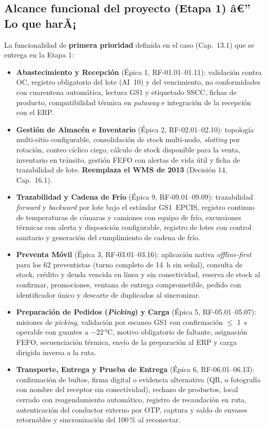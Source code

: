 \subsection{Alcance funcional del proyecto (Etapa 1) â€” Lo que harÃ¡}

La funcionalidad de \textbf{primera prioridad} definida en el caso (Cap.\ 13.1) que se entrega en la Etapa 1:

\begin{itemize}
  \item \textbf{Abastecimiento y Recepción} (Épica 1, RF-01.01--01.11): validación contra OC, registro obligatorio del lote (AI~10) y del vencimiento, no conformidades con cuarentena automática, lectura GS1 y etiquetado SSCC, fichas de producto, compatibilidad térmica en \emph{putaway} e integración de la recepción con el ERP.
  \item \textbf{Gestión de Almacén e Inventario} (Épica 2, RF-02.01--02.10): topología multi-sitio configurable, consolidación de stock multi-nodo, \emph{slotting} por rotación, conteo cíclico ciego, cálculo de stock disponible para la venta, inventario en tránsito, gestión FEFO con alertas de vida útil y ficha de trazabilidad de lote. \textbf{Reemplaza el WMS de 2013} (Decisión 14, Cap.\ 16.1).
  \item \textbf{Trazabilidad y Cadena de Frío} (Épica 9, RF-09.01--09.09): trazabilidad \emph{forward} y \emph{backward} por lote bajo el estándar GS1~EPCIS, registro continuo de temperaturas de cámaras y camiones con equipo de frío, excursiones térmicas con alerta y disposición configurable, registro de lotes con control sanitario y generación del cumplimiento de cadena de frío.
  \item \textbf{Preventa Móvil} (Épica 3, RF-03.01--03.16): aplicación nativa \emph{offline-first} para los 62 preventistas (turno completo de 14~h sin señal), consulta de stock, crédito y deuda vencida en línea y sin conectividad, reserva de stock al confirmar, promociones, ventana de entrega comprometible, pedido con identificador único y descarte de duplicados al sincronizar.
  \item \textbf{Preparación de Pedidos (\emph{Picking}) y Carga} (Épica 5, RF-05.01--05.07): misiones de \emph{picking}, validación por escaneo GS1 con confirmación $\leq$ 1~s operable con guantes a $-22$\,°C, motivo obligatorio de faltante, asignación FEFO, secuenciación térmica, envío de la preparación al ERP y carga dirigida inversa a la ruta.
  \item \textbf{Transporte, Entrega y Prueba de Entrega} (Épica 6, RF-06.01--06.13): confirmación de bultos, firma digital o evidencia alternativa (QR, o fotografía con nombre del receptor sin conectividad), rechazo de productos, local cerrado con reagendamiento automático, registro de recaudación en ruta, autenticación del conductor externo por OTP, captura y saldo de envases retornables y sincronización del 100\,\% al reconectar.

\end{itemize}
